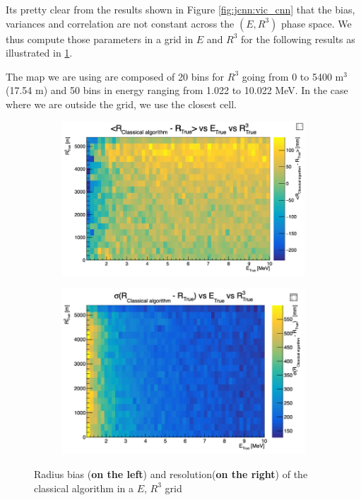 \documentclass[../main.tex]{subfiles}
\begin{document}
Its pretty clear from the results shown in Figure \ref{fig:jcnn:vic_cnn} that the bias, variances and correlation are not constant across the $(E, R^3)$ phase space. We thus compute those parameters in a grid in $E$ and $R^3$ for the following results as illustrated in \ref{fig:jcnn:vic_cnn:res_map}.

The map we are using are composed of 20 bins for $R^3$ going from 0 to 5400 m$^3$ (17.54 m) and 50 bins in energy ranging from 1.022 to 10.022 MeV. In the case where we are outside the grid, we use the closest cell.

\begin{figure}
  \centering
  \begin{subfigure}[t]{0.48\linewidth}
    \includegraphics[width=\linewidth]{images/jcnn/vic_cnn/vic_r_bias.png}
  \end{subfigure}
  \hfill
  \begin{subfigure}[t]{0.48\linewidth}
    \includegraphics[width=\linewidth]{images/jcnn/vic_cnn/vic_r_res.png}
  \end{subfigure}
  \caption{Radius bias (\textbf{on the left}) and resolution(\textbf{on the right}) of the classical algorithm in a $E$, $R^3$ grid}
  \label{fig:jcnn:vic_cnn:res_map}
\end{figure}
\end{document}
